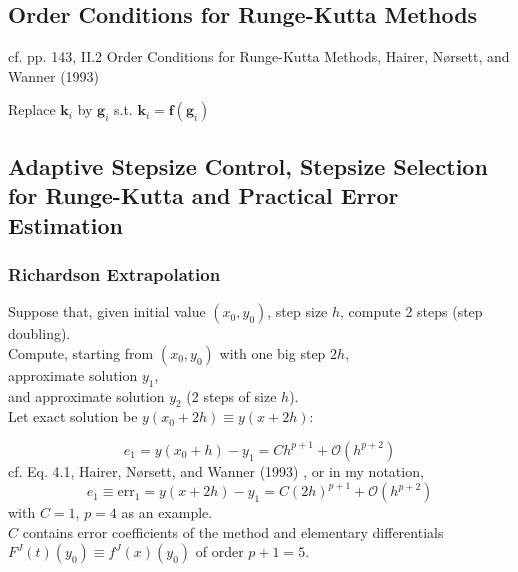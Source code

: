 \documentclass[10pt]{amsart}
\begin{document}
\begin{multicols*}{2}
\subsection{Order Conditions for Runge-Kutta Methods}

cf. pp. 143, II.2 Order Conditions for Runge-Kutta Methods, Hairer, N\o rsett, and Wanner (1993) \cite{HNW1993}

Replace $\mathbf{k}_i$ by $\mathbf{g}_i$ s.t. $\mathbf{k}_i = \mathbf{f}(\mathbf{g}_i)$

\subsection{Adaptive Stepsize Control, Stepsize Selection for Runge-Kutta and Practical Error Estimation}

\subsubsection{Richardson Extrapolation}

Suppose that, given initial value $(x_0, y_0)$, step size $h$, compute 2 steps (step doubling). \\

Compute, starting from $(x_0, y_0)$ with one big step $2h$, \\
approximate solution $y_1$, \\
and approximate solution $y_2$ (2 steps of size $h$). \\

Let exact solution be $y(x_0 + 2h) \equiv y(x + 2h)$:

\begin{equation}
	e_1 = y(x_0 + h) - y_1 = Ch^{p+1} + \mathcal{O}(h^{p + 2})
\end{equation}
cf. Eq. 4.1, Hairer, N\o rsett, and Wanner (1993) \cite{HNW1993}, or in my notation,
\begin{equation}
	e_1 \equiv \text{err}_1 = y(x+2h) - y_1 = C(2h)^{p+1} + \mathcal{O}(h^{p+2})
\end{equation}
with $C = 1$, $p=4$ as an example. \\

$C$ contains error coefficients of the method and elementary differentials $F^J(t)(y_0) \equiv f^J(x)(y_0)$ of order $p+1 =5$.


\end{multicols*}
\end{document}
